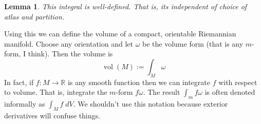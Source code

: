 \documentclass[11pt]{article}
\newcommand{\defeq}{:=}
\DeclareMathOperator{\vol}{\textrm{vol}}
\newcommand{\R}{\mathbb{R}}
\newtheorem{lemma}[theorem]{Lemma}
\begin{document}
\begin{lemma}
This integral is well-defined.
That is, its independent of choice of atlas and partition.
\end{lemma}

Using this we can define the volume of a compact, orientable Riemannian manifold.
Choose any orientation and let $\omega$ be the volume form (that is any $m$-form, I think).
Then the volume is
\[
	\vol(M)\defeq\int_M \omega
\]
In fact, if $f:M \to \R$ is any smooth function then we can integrate $f$ with respect to volume.
That is, integrate the $m$-form $f\omega$.
The result $\int_m f\omega$ is often denoted informally as $\int_M f \; dV$.
We shouldn't use this notation because exterior derivatives will confuse things.
\end{document}
